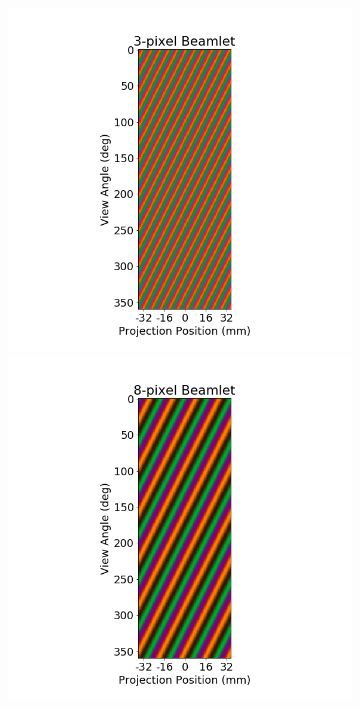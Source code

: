 \documentclass[12pt]{spieman}  %
\begin{document}
\begin{spacing}{1}
\begin{figure}
\begin{subfigure}[t]{.55\textwidth}
      \includegraphics[clip, trim={5cm 1cm 6cm 1cm}, scale = 0.3]{figures/CMYK_xi3.png}
      \includegraphics[clip, trim={5cm 1cm 6cm 1cm}, scale = 0.3]{figures/CMYK_xi8.png}

\end{subfigure}
\end{figure}
\end{spacing}
\end{document}
